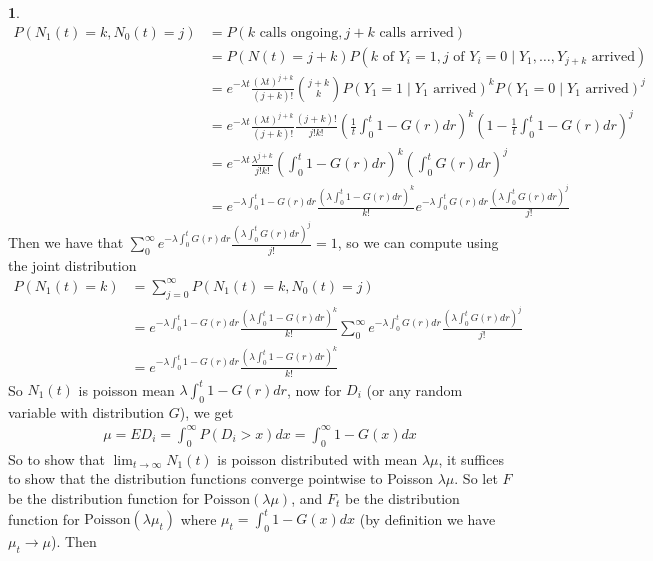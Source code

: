 \documentclass{article}
\theoremstyle{definition}
\newtheorem{pb}{}
\begin{document}
\begin{pb}
        \begin{align*}
            P(N_1(t) = k, N_0(t) = j) &= P(k \text{ calls ongoing}, j+k \text{ calls arrived}) \\
             &= P(N(t) = j + k)P(k \text{ of } Y_i = 1, j \text{ of } Y_i = 0 \mid Y_1,\hdots,Y_{j+k} \text{ arrived}) \\
            &= e^{-\lambda t}\frac{(\lambda t)^{j+k}}{(j+k)!}\binom{j+k}{k}P(Y_1 = 1 \mid Y_1 \text{ arrived})^kP(Y_1 = 0 \mid Y_1 \text{ arrived})^j \\
            &= e^{-\lambda t}\frac{(\lambda t)^{j+k}}{(j+k)!}\frac{(j+k)!}{j!k!}\left(\frac{1}{t}\int_0^t1-G(r)dr\right)^k\left(1 - \frac{1}{t}\int_0^t1-G(r)dr\right)^j \\
            &= e^{-\lambda t} \frac{\lambda^{j+k}}{j!k!}\left(\int_0^t 1 - G(r)dr\right)^k\left(\int_0^t G(r)dr\right)^j \\
            &= e^{-\lambda \int_0^t 1-G(r)dr} \frac{\left(\lambda\int_0^t 1 - G(r)dr\right)^k}{k!} e^{-\lambda \int_0^t G(r)dr} \frac{\left(\lambda\int_0^t G(r)dr\right)^j}{j!}
        \end{align*}
        Then we have that \(\sum_0^\infty e^{-\lambda \int_0^t G(r)dr} \frac{\left(\lambda\int_0^t G(r)dr\right)^j}{j!} = 1\), so we can compute using the joint distribution
        \begin{align*}
            P(N_1(t) = k) &= \sum_{j=0}^\infty P(N_1(t)=k, N_0(t)=j) \\
            &= e^{-\lambda \int_0^t 1-G(r)dr} \frac{\left(\lambda\int_0^t 1 - G(r)dr\right)^k}{k!}\sum_0^\infty e^{-\lambda \int_0^t G(r)dr} \frac{\left(\lambda\int_0^t G(r)dr\right)^j}{j!} \\
            &= e^{-\lambda \int_0^t 1-G(r)dr} \frac{\left(\lambda\int_0^t 1 - G(r)dr\right)^k}{k!}
        \end{align*}
        So \(N_1(t)\) is poisson mean \(\lambda\int_0^t 1-G(r)dr\), now for \(D_i\) (or any random variable with distribution \(G\)), we get
        \begin{align*}
            \mu = E D_i = \int_0^\infty P(D_i > x)dx = \int_{0}^\infty 1 - G(x)dx
        \end{align*}
        So to show that \(\lim_{t\to\infty}N_1(t)\) is poisson distributed with mean \(\lambda\mu\), it suffices to show that the distribution functions converge pointwise to Poisson \(\lambda\mu\). So let \(F\) be the distribution function for \(\text{Poisson}(\lambda\mu)\), and \(F_t\) be the distribution function for \(\text{Poisson}(\lambda\mu_t)\) where \(\mu_t = \int_0^t 1-G(x)dx\) (by definition we have \(\mu_t \to \mu\)). Then

\end{pb}
\end{document}
